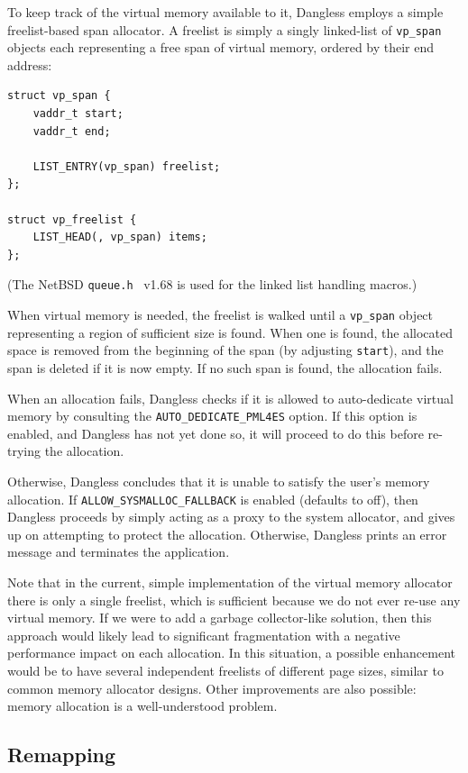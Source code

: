 To keep track of the virtual memory available to it, Dangless employs a simple freelist-based span allocator. A freelist is simply a singly linked-list of \lstinline!vp_span! objects each representing a free span of virtual memory, ordered by their end address:

\begin{lstlisting}
struct vp_span {
	vaddr_t start;
	vaddr_t end;
	
	LIST_ENTRY(vp_span) freelist;
};

struct vp_freelist {
	LIST_HEAD(, vp_span) items;
};
\end{lstlisting}

(The NetBSD \texttt{queue.h}~\cite{netbsd-queue-ref} v1.68 is used for the linked list handling macros.)

When virtual memory is needed, the freelist is walked until a \lstinline!vp_span! object representing a region of sufficient size is found. When one is found, the allocated space is removed from the beginning of the span (by adjusting \lstinline!start!), and the span is deleted if it is now empty. If no such span is found, the allocation fails.

When an allocation fails, Dangless checks if it is allowed to auto-dedicate virtual memory by consulting the \lstinline!AUTO_DEDICATE_PML4ES! option. If this option is enabled, and Dangless has not yet done so, it will proceed to do this before re-trying the allocation.

Otherwise, Dangless concludes that it is unable to satisfy the user's memory allocation. If \lstinline!ALLOW_SYSMALLOC_FALLBACK! is enabled (defaults to off), then Dangless proceeds by simply acting as a proxy to the system allocator, and gives up on attempting to protect the allocation. Otherwise, Dangless prints an error message and terminates the application.

Note that in the current, simple implementation of the virtual memory allocator there is only a single freelist, which is sufficient because we do not ever re-use any virtual memory. If we were to add a garbage collector-like solution, then this approach would likely lead to significant fragmentation with a negative performance impact on each allocation. In this situation, a possible enhancement would be to have several independent freelists of different page sizes, similar to common memory allocator designs. Other improvements are also possible: memory allocation is a well-understood problem.

\subsection{Remapping}
\label{ssec:remapping}

